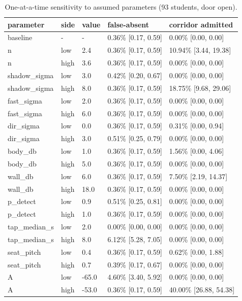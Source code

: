 \begin{table}[t]
\centering
\caption{One-at-a-time sensitivity to assumed parameters (93 students, door open).}\label{tab:e08}
\begin{tabular}{lllll}
\toprule
parameter & side & value & false-absent & corridor admitted \\
\midrule
baseline & - & - & 0.36\% [0.17, 0.59] & 0.00\% [0.00, 0.00] \\
n & low & 2.4 & 0.36\% [0.17, 0.59] & 10.94\% [3.44, 19.38] \\
n & high & 3.6 & 0.36\% [0.17, 0.59] & 0.00\% [0.00, 0.00] \\
shadow\_sigma & low & 3.0 & 0.42\% [0.20, 0.67] & 0.00\% [0.00, 0.00] \\
shadow\_sigma & high & 8.0 & 0.36\% [0.17, 0.59] & 18.75\% [9.68, 29.06] \\
fast\_sigma & low & 2.0 & 0.36\% [0.17, 0.59] & 0.00\% [0.00, 0.00] \\
fast\_sigma & high & 6.0 & 0.36\% [0.17, 0.59] & 0.00\% [0.00, 0.00] \\
dir\_sigma & low & 0.0 & 0.36\% [0.17, 0.59] & 0.31\% [0.00, 0.94] \\
dir\_sigma & high & 3.0 & 0.51\% [0.25, 0.79] & 0.00\% [0.00, 0.00] \\
body\_db & low & 1.0 & 0.36\% [0.17, 0.59] & 1.56\% [0.00, 4.06] \\
body\_db & high & 5.0 & 0.36\% [0.17, 0.59] & 0.00\% [0.00, 0.00] \\
wall\_db & low & 6.0 & 0.36\% [0.17, 0.59] & 7.50\% [2.19, 14.37] \\
wall\_db & high & 18.0 & 0.36\% [0.17, 0.59] & 0.00\% [0.00, 0.00] \\
p\_detect & low & 0.9 & 0.51\% [0.25, 0.81] & 0.00\% [0.00, 0.00] \\
p\_detect & high & 1.0 & 0.36\% [0.17, 0.59] & 0.00\% [0.00, 0.00] \\
tap\_median\_s & low & 2.0 & 0.00\% [0.00, 0.00] & 0.00\% [0.00, 0.00] \\
tap\_median\_s & high & 8.0 & 6.12\% [5.28, 7.05] & 0.00\% [0.00, 0.00] \\
seat\_pitch & low & 0.4 & 0.36\% [0.17, 0.59] & 0.62\% [0.00, 1.88] \\
seat\_pitch & high & 0.7 & 0.39\% [0.17, 0.67] & 0.00\% [0.00, 0.00] \\
A & low & -65.0 & 4.60\% [3.40, 5.92] & 0.00\% [0.00, 0.00] \\
A & high & -53.0 & 0.36\% [0.17, 0.59] & 40.00\% [26.88, 54.38] \\
\bottomrule
\end{tabular}
\end{table}
